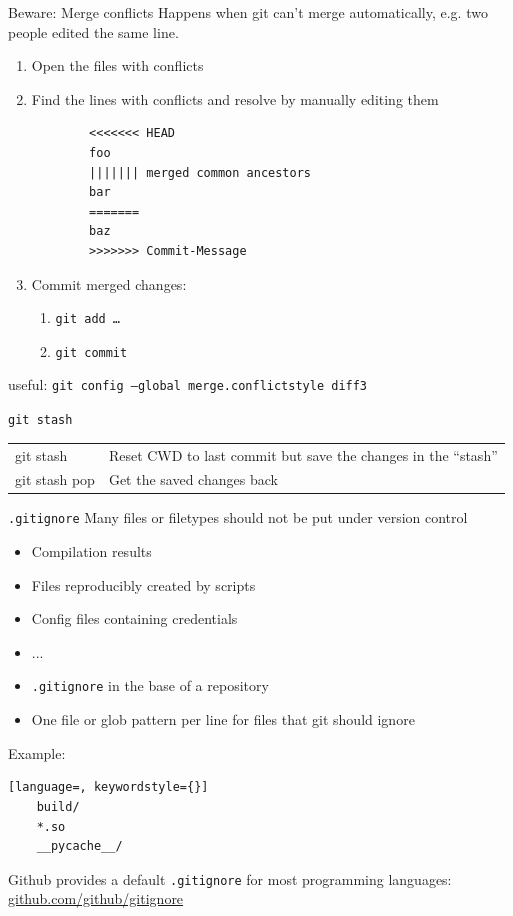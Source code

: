 \begin{frame}[fragile]{Beware: Merge conflicts}
  Happens when git can't merge automatically, e.g. two people edited the same line.

  \begin{enumerate}
    \item Open the files with conflicts
    \item Find the lines with conflicts and resolve by manually editing them
      \begin{verbatim}
        <<<<<<< HEAD
        foo
        ||||||| merged common ancestors
        bar
        =======
        baz
        >>>>>>> Commit-Message
\end{verbatim}
    \item Commit merged changes:
      \begin{enumerate}
        \item \texttt{git add …}
        \item \texttt{git commit}
      \end{enumerate}
  \end{enumerate}
  useful: \texttt{git config --global merge.conflictstyle diff3}
\end{frame}

\begin{frame}{\texttt{git stash}}
  \begin{tabu}{>{\ttfamily}l X[,L]}
    git stash     & Reset CWD to last commit but save the changes in the \enquote{stash} \\
    git stash pop & Get the saved changes back
  \end{tabu}
\end{frame}

\begin{frame}[fragile]{\texttt{.gitignore}}
  Many files or filetypes should not be put under version control
  \begin{itemize}
    \item Compilation results
    \item Files reproducibly created by scripts
    \item Config files containing credentials
    \item ...
  \end{itemize}

  \begin{itemize}
  \item \texttt{.gitignore} in the base of a repository
  \item One file or glob pattern per line for files that git should ignore
  \end{itemize}
  Example:
  \begin{lstlisting}[language=, keywordstyle={}]
    build/
    *.so
    __pycache__/
  \end{lstlisting}

  Github provides a default \texttt{.gitignore} for most programming languages: \href{https://github.com/github/gitignore}{github.com/github/gitignore}
\end{frame}

